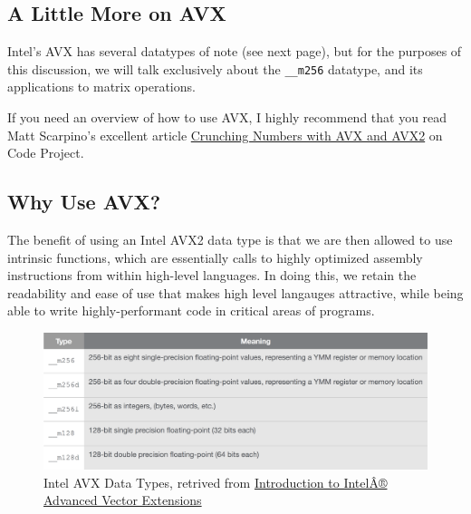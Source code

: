\documentclass[10pt]{article}
\theoremstyle{definition}
\theoremstyle{plain}
\begin{document}
\subsection{A Little More on AVX}
Intel's AVX has several datatypes of note (see next page), but for the purposes of this discussion, we will talk exclusively about the \texttt{\_\_m256} datatype, and its applications to matrix operations.

If you need an overview of how to use AVX, I highly recommend that you read Matt Scarpino's excellent article \href{https://www.codeproject.com/Articles/874396/Crunching-Numbers-with-AVX-and-AVX}{Crunching Numbers with AVX and AVX2} on Code Project.

\subsection{Why Use AVX?}
The benefit of using an Intel AVX2 data type is that we are then allowed to use intrinsic functions, which are essentially calls to highly optimized assembly instructions from within high-level languages. In doing this, we retain the readability and ease of use that makes high level langauges attractive, while being able to write highly-performant code in critical areas of programs.



\pagebreak



\vspace*{\fill}
\begin{figure}[h]
\includegraphics[width=\textwidth]{images/tbl1}
\caption{Intel AVX Data Types, retrived from \href{https://software.intel.com/en-us/articles/introduction-to-intel-advanced-vector-extensions}{Introduction to IntelÂ® Advanced Vector Extensions}}
\centering
\end{figure}
\vspace*{\fill}



\pagebreak
\end{document}

